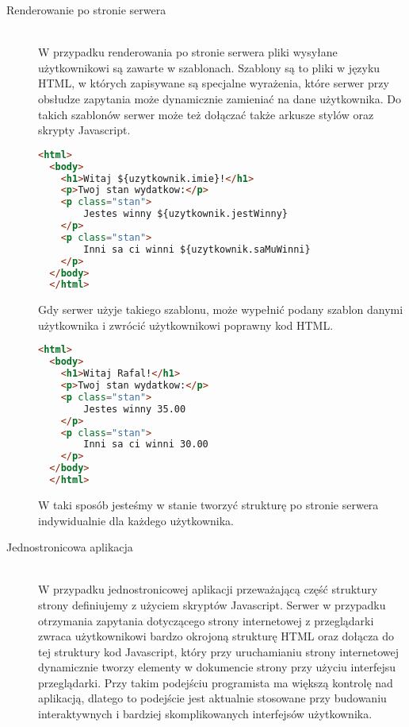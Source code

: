 \begin{description}
  \item[Renderowanie po stronie serwera] \hfill \\ W przypadku renderowania po stronie serwera pliki wysyłane użytkownikowi są zawarte w szablonach. Szablony są to pliki w języku HTML, w których zapisywane są specjalne wyrażenia, które serwer przy obsłudze zapytania może dynamicznie zamieniać na dane użytkownika. Do takich szablonów serwer może też dołączać także arkusze stylów oraz skrypty Javascript.
\clearpage
  \begin{lstlisting}[language=HTML, caption=Przykład szablonu w Freemaker]
  <html>
  <body>
    <h1>Witaj ${uzytkownik.imie}!</h1>
    <p>Twoj stan wydatkow:</p>
    <p class="stan">
        Jestes winny ${uzytkownik.jestWinny}
    </p>
    <p class="stan">
        Inni sa ci winni ${uzytkownik.saMuWinni}
    </p>
  </body>
  </html>
  \end{lstlisting}

  Gdy serwer użyje takiego szablonu, może wypełnić podany szablon danymi użytkownika i zwrócić użytkownikowi poprawny kod HTML.

  \begin{lstlisting}[language=HTML, caption=Przykład wyniku zwróconego z szablonu]
  <html>
  <body>
    <h1>Witaj Rafal!</h1>
    <p>Twoj stan wydatkow:</p>
    <p class="stan">
        Jestes winny 35.00
    </p>
    <p class="stan">
        Inni sa ci winni 30.00
    </p>
  </body>
  </html>
  \end{lstlisting}
  W taki sposób jesteśmy w stanie tworzyć strukturę po stronie serwera indywidualnie dla każdego użytkownika.
  \vspace{0.4cm}

  \item[Jednostronicowa aplikacja] \hfill \\ W przypadku jednostronicowej aplikacji przeważającą część struktury strony definiujemy z użyciem skryptów Javascript. Serwer w przypadku otrzymania zapytania dotyczącego strony internetowej z przeglądarki zwraca użytkownikowi bardzo okrojoną strukturę HTML oraz dołącza do tej struktury kod Javascript, który przy uruchamianiu strony internetowej dynamicznie tworzy elementy w dokumencie strony przy użyciu interfejsu przeglądarki. Przy takim podejściu programista ma większą kontrolę nad aplikacją, dlatego to podejście jest aktualnie stosowane przy budowaniu interaktywnych i bardziej skomplikowanych interfejsów użytkownika.


\end{description}
